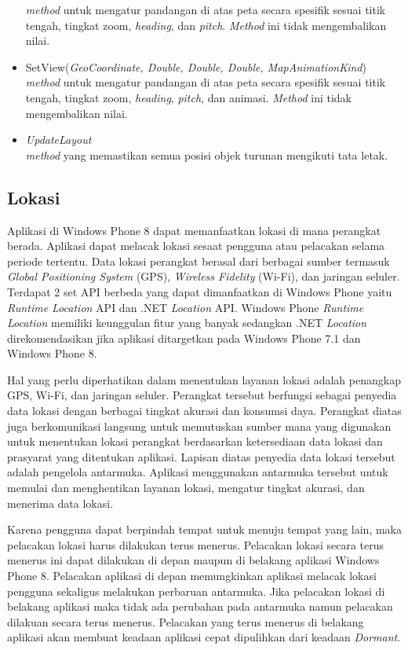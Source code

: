 \begin{itemize}
	\textit{method} untuk mengatur pandangan di atas peta secara spesifik sesuai titik tengah, tingkat zoom, \textit{heading}, dan \textit{pitch}. \textit{Method} ini tidak mengembalikan nilai.
	\item SetView(\textit{GeoCoordinate, Double, Double, Double, MapAnimationKind}) \\
	\textit{method} untuk mengatur pandangan di atas peta secara spesifik sesuai titik tengah, tingkat zoom, \textit{heading}, \textit{pitch}, dan animasi. \textit{Method} ini tidak mengembalikan nilai.
	\item \textit{UpdateLayout} \\
	\textit{method} yang memastikan semua posisi objek turunan mengikuti tata letak. 
\end{itemize}

\subsection{Lokasi}
\label{subsec:Lokasi}
\hspace{0.5cm} Aplikasi di Windows Phone 8 dapat memanfaatkan lokasi di mana perangkat berada. Aplikasi dapat melacak lokasi sesaat  pengguna atau pelacakan selama periode tertentu. Data lokasi perangkat berasal dari berbagai sumber termasuk \textit{Global Positioning System} (GPS), \textit{Wireless Fidelity} (Wi-Fi), dan jaringan seluler. Terdapat 2 set API berbeda yang dapat dimanfaatkan di Windows Phone yaitu \textit{Runtime Location} API dan .NET \textit{Location} API. Windows Phone \textit{Runtime Location} memiliki keunggulan fitur yang banyak sedangkan .NET \textit{Location} direkomendasikan jika aplikasi ditargetkan pada Windows Phone 7.1 dan Windows Phone 8\cite{MSDN}.

Hal yang perlu diperhatikan dalam menentukan layanan lokasi adalah penangkap GPS, Wi-Fi, dan jaringan seluler. Perangkat tersebut berfungsi sebagai penyedia data lokasi dengan berbagai tingkat akurasi dan konsumsi daya. Perangkat diatas juga berkomunikasi langsung untuk memutuskan sumber mana yang digunakan untuk menentukan lokasi perangkat berdasarkan ketersediaan data lokasi dan prasyarat yang ditentukan aplikasi. Lapisan diatas penyedia data lokasi tersebut adalah pengelola antarmuka. Aplikasi menggunakan antarmuka tersebut untuk memulai dan menghentikan layanan lokasi, mengatur tingkat akurasi, dan menerima data lokasi.

Karena pengguna dapat berpindah tempat untuk menuju tempat yang lain, maka pelacakan lokasi harus dilakukan terus menerus. Pelacakan lokasi secara terus menerus ini dapat dilakukan di depan maupun di belakang aplikasi Windows Phone 8. Pelacakan aplikasi di depan memungkinkan aplikasi melacak lokasi pengguna sekaligus melakukan perbaruan antarmuka. Jika pelacakan lokasi di belakang aplikasi maka tidak ada perubahan pada antarmuka namun pelacakan dilakuan secara terus menerus. Pelacakan yang terus menerus di belakang aplikasi akan membuat keadaan aplikasi cepat dipulihkan dari keadaan \textit{Dormant}.

